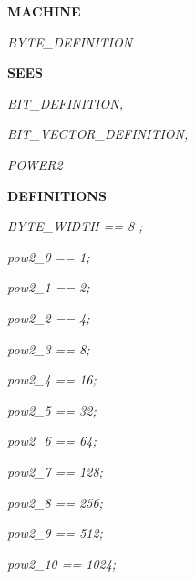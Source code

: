 

\bf MACHINE

\hspace*{0.20in}\it BYTE\_DEFINITION

\hspace*{0.20in}

\bf SEES 

\hspace*{0.20in}\it BIT\_DEFINITION\rm ,

\hspace*{0.20in}\it BIT\_VECTOR\_DEFINITION\rm ,

\hspace*{0.20in}\it POWER2

\hspace*{0.20in}

\bf DEFINITIONS

\hspace*{0.20in}\it BYTE\_WIDTH \rm == \rm 8 \rm ;

\hspace*{0.20in}

\hspace*{0.20in}\it pow2\_0 \rm == \rm 1\rm ;

\hspace*{0.20in}\it pow2\_1 \rm == \rm 2\rm ;

\hspace*{0.20in}\it pow2\_2 \rm == \rm 4\rm ;

\hspace*{0.20in}\it pow2\_3 \rm == \rm 8\rm ;

\hspace*{0.20in}\it pow2\_4 \rm == \rm 1\rm 6\rm ;

\hspace*{0.20in}\it pow2\_5 \rm == \rm 3\rm 2\rm ;

\hspace*{0.20in}\it pow2\_6 \rm == \rm 6\rm 4\rm ;

\hspace*{0.20in}\it pow2\_7 \rm == \rm 1\rm 2\rm 8\rm ;

\hspace*{0.20in}\it pow2\_8 \rm == \rm 2\rm 5\rm 6\rm ;

\hspace*{0.20in}\it pow2\_9 \rm == \rm 5\rm 1\rm 2\rm ;

\hspace*{0.20in}\it pow2\_10 \rm == \rm 1\rm 0\rm 2\rm 4\rm ;\hspace*{0.20in}

